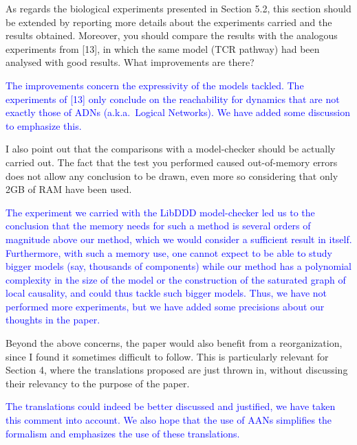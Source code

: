 \documentclass[11pt]{article}
\newcommand{\answer}[1]{\textcolor{blue}{#1}\vspace*{1em}}
\begin{document}
As regards the biological experiments presented in Section 5.2, this section should be extended by reporting more details about the experiments carried and the results obtained. Moreover, you should compare the results with the analogous experiments from [13], in which the same model (TCR pathway) had been analysed with good results. What improvements are there?

\answer{
The improvements concern the expressivity of the models tackled.
The experiments of [13] only conclude on the reachability for dynamics
that are not exactly those of ADNs (a.k.a.~Logical Networks).
We have added some discussion to emphasize this.
}

I also point out that the comparisons with a model-checker should be actually carried out. The fact that the test you performed caused out-of-memory errors does not allow any conclusion to be drawn, even more so considering that only 2GB of RAM have been used.

\answer{
The experiment we carried with the LibDDD model-checker led us to the conclusion that the memory needs for such a method is several orders of magnitude above our method, which we would consider a sufficient result in itself.
Furthermore, with such a memory use, one cannot expect to be able to study bigger models (say, thousands of components) while our method has a polynomial complexity in the size of the model or the construction of the saturated graph of local causality, and could thus tackle such bigger models.
Thus, we have not performed more experiments,
but we have added some precisions about our thoughts in the paper.
}

Beyond the above concerns, the paper would also benefit from a reorganization, since I found it sometimes difficult to follow. This is particularly relevant for Section 4, where the translations proposed are just thrown in, without discussing their relevancy to the purpose of the paper.

\answer{
The translations could indeed be better discussed and justified,
we have taken this comment into account.
We also hope that the use of AANs simplifies the formalism
and emphasizes the use of these translations.
}
\end{document}
